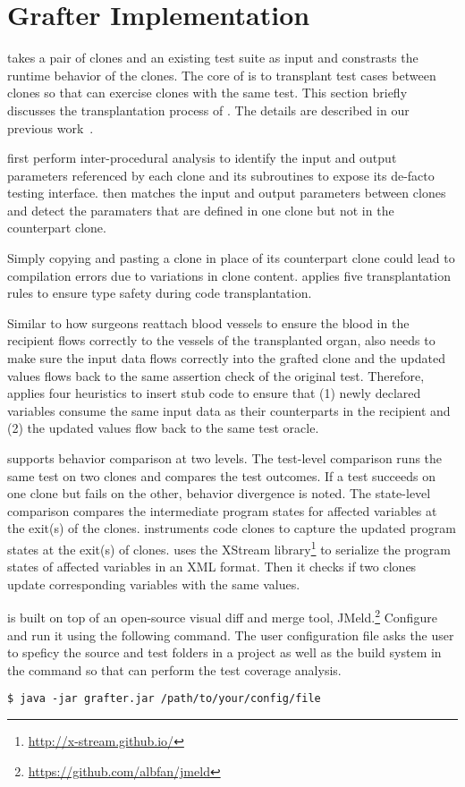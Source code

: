 \section{Grafter Implementation}
{\grafter} takes a pair of clones and an existing test suite as input and constrasts the runtime behavior of the clones. The core of {\grafter} is to transplant test cases between clones so that {\grafter} can exercise clones with the same test. This section briefly discusses the transplantation process of {\grafter}. The details are described in our previous work~\cite{zhang2017automated}.

 {\grafter} first perform inter-procedural analysis to identify the input and output parameters referenced by each clone and its subroutines to expose its de-facto testing interface. {\grafter} then matches the input and output parameters between clones and detect the paramaters that are defined in one clone but not in the counterpart clone.

 Simply copying and pasting a clone in place of its counterpart clone could lead to compilation errors due to variations in clone content. {\grafter} applies five transplantation
rules to ensure type safety during code transplantation.  

 Similar to how surgeons reattach blood vessels to ensure the
blood in the recipient flows correctly to the vessels of the transplanted organ, {\grafter} also needs to make sure the input data flows correctly into the grafted clone and the updated values flows back to the same assertion check of the original test. Therefore, {\grafter} applies four heuristics to insert stub code to
ensure that (1) newly declared variables consume the same input data as their counterparts in the recipient and (2) the updated values flow back to the same test oracle.

 {\grafter} supports behavior comparison at two levels. The test-level comparison runs the same test on two clones and compares the test outcomes. If a test succeeds on one clone but fails on the other, behavior divergence is noted. The state-level comparison compares the intermediate program states for affected variables at the exit(s) of the clones. {\grafter} instruments code clones to capture the updated program states at the exit(s) of clones. {\grafter} uses the XStream library\footnote{\url{http://x-stream.github.io/}} to serialize the program states of affected variables in an XML format. Then it checks if two clones update corresponding variables with the same values.

{\grafter} is built on top of an open-source visual diff and merge tool, JMeld.\footnote{\url{https://github.com/albfan/jmeld}} Configure {\grafter} and run it using the following command. The user configuration file asks the user to speficy the source and test folders in a project as well as the build system in the command so that {\grafter} can perform the test coverage analysis.

\begin{lstlisting}
$ java -jar grafter.jar /path/to/your/config/file
\end{lstlisting}
